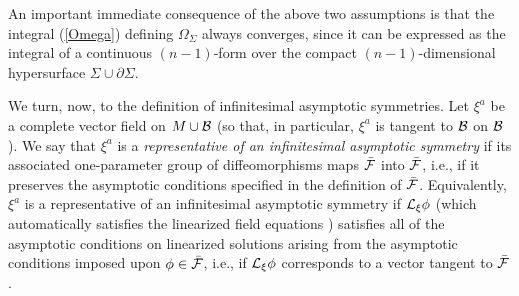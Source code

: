An important immediate consequence of the above two assumptions is
that the integral (\ref{Omega}) defining $\Omega_\Sigma$ always converges,
since it can be expressed as the integral of a continuous $(n-1)$-form
over the compact $(n-1)$-dimensional hypersurface $\Sigma \cup
\partial \Sigma$.

We turn, now, to the definition of infinitesimal asymptotic
symmetries. Let $\xi^a$ be a complete vector field on $M \cup {\cal
B}$ (so that, in particular, $\xi^a$ is tangent to $\cal B$ on $\cal
B$). We say that $\xi^a$ is a {\it representative of an infinitesimal
asymptotic symmetry} if its associated one-parameter group of
diffeomorphisms maps $\bar{\cal F}$ into $\bar{\cal F}$, i.e., if it
preserves the asymptotic conditions specified in the definition of
$\bar{\cal F}$. Equivalently, $\xi^a$ is a representative of an
infinitesimal asymptotic symmetry if ${\cal L}_\xi \phi$ (which
automatically satisfies the linearized field equations \cite{lw})
satisfies all of the asymptotic conditions on linearized solutions arising
from the asymptotic conditions imposed upon $\phi \in \bar{\cal F}$,
i.e., if ${\cal L}_\xi \phi$ corresponds to a vector tangent to
$\bar{\cal F}$.

